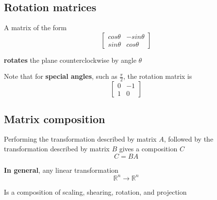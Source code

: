 \subsection{Rotation matrices}
\begin{framed}
   A matrix of the form \[
     \begin{bmatrix} 
        cos \theta & -sin \theta \\ sin \theta & cos \theta  
     \end{bmatrix}
   \] 

   \textbf{rotates} the plane counterclockwise by angle $ \theta$ 

   Note that for \textbf{special angles}, such as $ \frac{\pi}{2}$, the rotation matrix is \[
     \begin{bmatrix} 
        0 & -1 \\ 1 & 0  
     \end{bmatrix}
   \] 
\end{framed}

\subsection{Matrix composition}
\begin{framed}
   Performing the transformation described by matrix $A$, followed by the transformation described by matrix $B$ gives a composition $C$ \[
     C = BA
   \] 

   \textbf{In general}, any linear transformation \[
      \mathbb{R}^n \to \mathbb{R}^n
   \]  

   Is a composition of scaling, shearing, rotation, and projection
\end{framed}

